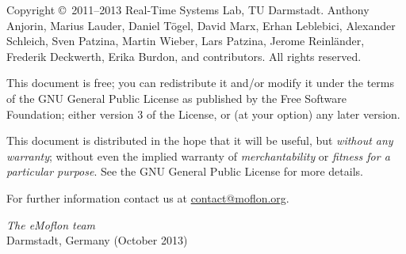 \begin{small} 
Copyright \copyright~2011--2013 Real-Time Systems Lab, TU Darmstadt.
Anthony Anjorin, Marius Lauder, Daniel T\"ogel, David Marx, Erhan Leblebici, Alexander Schleich, Sven Patzina, Martin Wieber, Lars Patzina, Jerome Reinl\"ander, Frederik Deckwerth, Erika Burdon, and contributors.
All rights reserved.

This document is free; you can redistribute it and/or modify it under the terms of the GNU General Public License as published by the Free Software Foundation; either version 3 of the License, or (at your option) any later version.
 
This document is distributed in the hope that it will be useful, but \emph{without any warranty}; without even the implied warranty of \emph{merchantability} or \emph{fitness for a particular purpose}.
See the GNU General Public License for more details.
 
  
For further information contact us at \href{mailto:contact@moflon.org}{contact@moflon.org}.
  
\vskip3cm
\textit{The eMoflon team}\\
Darmstadt, Germany (October 2013)
\end{small}
